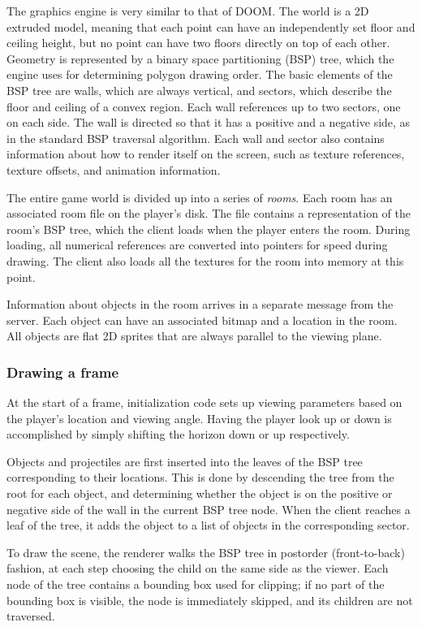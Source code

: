 The graphics engine is very similar to that of DOOM.  The world is a
2D extruded model, meaning that each point can have an independently
set floor and ceiling height, but no point can have two floors
directly on top of each other.  Geometry is represented by a binary
space partitioning (BSP) tree, which the engine uses for determining
polygon drawing order.  The basic elements of the BSP tree are walls,
which are always vertical, and sectors, which describe the floor and
ceiling of a convex region.  Each wall references up to two sectors,
one on each side.  The wall is directed so that it has a positive and
a negative side, as in the standard BSP traversal algorithm.  Each
wall and sector also contains information about how to render itself
on the screen, such as texture references, texture offsets, and
animation information.

The entire game world is divided up into a series of {\em rooms}.
Each room has an associated room file on the player's disk.  The file
contains a representation of the room's BSP tree, which the client
loads when the player enters the room.  During loading, all numerical
references are converted into pointers for speed during drawing.  The
client also loads all the textures for the room into memory at this point.

Information about objects in the room arrives in a separate message
from the server.  Each object can have an associated bitmap and a
location in the room.  All objects are flat 2D sprites that are always
parallel to the viewing plane.

\subsubsection{Drawing a frame}

At the start of a frame, initialization code sets up viewing
parameters based on the player's location and viewing angle.  Having
the player look up or down is accomplished by simply shifting the
horizon down or up respectively.

Objects and projectiles are first inserted into the leaves of the BSP
tree corresponding to their locations.  This is done by descending the
tree from the root for each object, and determining whether the object
is on the positive or negative side of the wall in the current BSP
tree node.  When the client reaches a leaf of the tree, it adds the
object to a list of objects in the corresponding sector.

To draw the scene, the renderer walks the BSP tree in postorder
(front-to-back) fashion, at each step choosing the child on the same
side as the viewer.  Each node of the tree contains a bounding box
used for clipping; if no part of the bounding box is visible, the node
is immediately skipped, and its children are not traversed.

